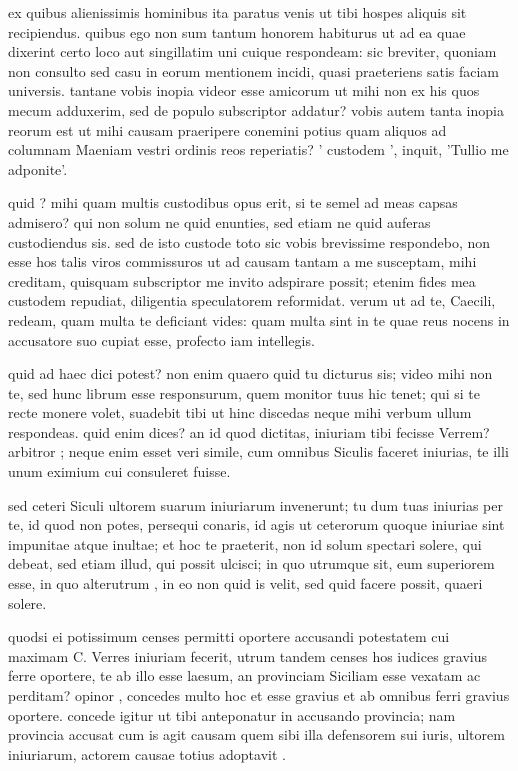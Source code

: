  ex quibus alienissimis hominibus ita paratus venis ut tibi hospes aliquis sit recipiendus. quibus ego non sum tantum honorem habiturus ut ad ea quae dixerint certo loco aut singillatim uni cuique respondeam: sic breviter, quoniam non consulto sed casu in eorum mentionem incidi, quasi praeteriens satis faciam universis. tantane vobis inopia videor esse amicorum ut mihi non ex his quos mecum adduxerim, sed de populo subscriptor addatur? vobis autem tanta inopia reorum est ut mihi causam praeripere conemini potius quam aliquos ad columnam Maeniam vestri ordinis reos reperiatis? ' custodem ', inquit, 'Tullio me adponite'.

 quid ? mihi quam multis custodibus opus erit, si te semel ad meas capsas admisero? qui non solum ne quid enunties, sed etiam ne quid auferas custodiendus sis. sed de isto custode toto sic vobis brevissime respondebo, non esse hos talis viros commissuros ut ad causam tantam a me susceptam, mihi creditam, quisquam subscriptor me invito adspirare possit; etenim fides mea custodem repudiat, diligentia speculatorem reformidat. verum ut ad te, Caecili, redeam, quam multa te deficiant vides: quam multa sint in te quae reus nocens in accusatore suo cupiat esse, profecto iam intellegis.

 quid ad haec dici potest? non enim quaero quid tu dicturus sis; video mihi non te, sed hunc librum esse responsurum, quem monitor tuus hic tenet; qui si te recte monere volet, suadebit tibi ut hinc discedas neque mihi verbum ullum respondeas. quid enim dices? an id quod dictitas, iniuriam tibi fecisse Verrem? arbitror ; neque enim esset veri simile, cum omnibus Siculis faceret iniurias, te illi unum eximium cui consuleret fuisse.

 sed ceteri Siculi ultorem suarum iniuriarum invenerunt; tu dum tuas iniurias per te, id quod non potes, persequi conaris, id agis ut ceterorum quoque iniuriae sint impunitae atque inultae; et hoc te praeterit, non id solum spectari solere, qui debeat, sed etiam illud, qui possit ulcisci; in quo utrumque sit, eum superiorem esse, in quo alterutrum , in eo non quid is velit, sed quid facere possit, quaeri solere.

 quodsi ei potissimum censes permitti oportere accusandi potestatem cui maximam C. Verres iniuriam fecerit, utrum tandem censes hos iudices gravius ferre oportere, te ab illo esse laesum, an provinciam Siciliam esse vexatam ac perditam? opinor , concedes multo hoc et esse gravius et ab omnibus ferri gravius oportere. concede igitur ut tibi anteponatur in accusando provincia; nam provincia accusat cum is agit causam quem sibi illa defensorem sui iuris, ultorem iniuriarum, actorem causae totius adoptavit .

